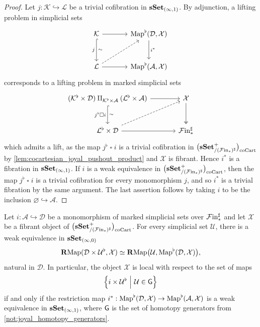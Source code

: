 \documentclass[10pt,reqno]{amsart}
\begin{document}
\begin{proof}
Let $j:\mathcal K\hookrightarrow\mathcal L$ be a trivial
cofibration in $\mathbf{sSet}_{(\infty,1)}$. By adjunction, a lifting
problem in simplicial sets
\[
\begin{tikzcd}[ampersand replacement=\&, sep=large]
\mathcal K\arrow[r]\arrow[d,hook,"j"',"\sim"]
\&\Map^\flat(\mathcal D,\mathcal X)\arrow[d,"i^*"]\\
\mathcal L\arrow[r]\arrow[ur,dashed]
\&\Map^\flat(\mathcal A,\mathcal X)
\end{tikzcd}
\]
corresponds to a lifting problem in marked simplicial sets
\[
\begin{tikzcd}[ampersand replacement=\&, sep=large]
(\mathcal K^\flat\times\mathcal D)
\amalg_{\mathcal K^\flat\times\mathcal A}
(\mathcal L^\flat\times\mathcal A)
\arrow[r]\arrow[d,hook,"j^\flat\mathbin{\square}i"',"\sim"]
\&\mathcal X\arrow[d,two heads]\\
\mathcal L^\flat\times\mathcal D
\arrow[r]\arrow[ur,dashed]\&\simFin^\sharp
\end{tikzcd}
\]
which admits a lift, as the map $j^\flat\mathbin{\square}i$ is a
trivial cofibration in $\bigl(\mathbf{sSet}^+_{/(\mathcal{F}\mathrm{in}_*)^\sharp}\bigr)_{\mathrm{coCart}}$ by
\cref{lem:cocartesian_joyal_pushout_product} and $\mathcal X$ is
fibrant. Hence $i^*$ is a fibration in $\mathbf{sSet}_{(\infty,1)}$. If
$i$ is a weak equivalence in $\bigl(\mathbf{sSet}^+_{/(\mathcal{F}\mathrm{in}_*)^\sharp}\bigr)_{\mathrm{coCart}}$, then the map
$j^\flat\mathbin{\square}i$ is a trivial cofibration for every
monomorphism $j$, and so $i^*$ is a trivial fibration by the same
argument. The last assertion follows by taking $i$ to be the
inclusion $\varnothing\hookrightarrow\mathcal A$.
\end{proof}

\begin{lemma}
\label{lem:marked_shape_locality}
Let $i:\mathcal A\hookrightarrow\mathcal D$ be a monomorphism of
marked simplicial sets over $\mathcal{F}\mathrm{in}_*^\sharp$ and let $\mathcal X$
be a fibrant object of $\bigl(\mathbf{sSet}^+_{/(\mathcal{F}\mathrm{in}_*)^\sharp}\bigr)_{\mathrm{coCart}}$. For every simplicial set
$\mathcal U$, there is a weak equivalence in $\mathbf{sSet}_{(\infty,0)}$
\[
\mathbf{R}\mathrm{Map}(\mathcal D\times\mathcal U^\flat,\mathcal X)
\simeq
\mathbf{R}\mathrm{Map}\bigl(\mathcal U,\operatorname{Map}^\flat(\mathcal D,\mathcal X)\bigr),
\]
natural in $\mathcal D$. In particular, the object $\mathcal X$
is local with respect to the set of maps
\[
\left\{i\times\mathcal U^\flat
  \ \middle|\ \mathcal U\in\mathsf G\right\}
\]
if and only if the restriction map
$i^*:\operatorname{Map}^\flat(\mathcal D,\mathcal X)
\to\operatorname{Map}^\flat(\mathcal A,\mathcal X)$
is a weak equivalence in $\mathbf{sSet}_{(\infty,1)}$, where $\mathsf G$ is
the set of homotopy generators from
\cref{not:joyal_homotopy_generators}.
\end{lemma}
\end{document}
